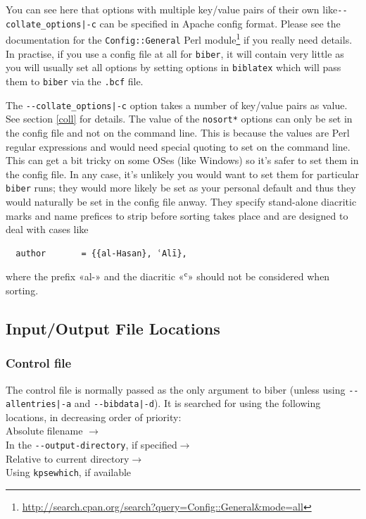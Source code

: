 \documentclass{ltxdockit}
\begin{document}
\noindent You can see here that options with multiple key/value pairs of
their own like\linebreak[4] \verb+--collate_options|-c+ can be specified in
Apache config format. Please see the documentation
for the \verb+Config::General+ Perl
module\footnote{\url{http://search.cpan.org/search?query=Config::General&mode=all}}
if you really need details. In practise, if you use a config file at all
for \verb+biber+, it will contain very little as you will usually set all
options by setting options in \verb+biblatex+ which will pass them to
\verb+biber+ via the \verb+.bcf+ file.

The \verb+--collate_options|-c+ option takes a number of key/value pairs as
value. See section \ref{coll} for details. The value of the \verb+nosort*+
options can only be set in the config file and not on the command line.
This is because the values are Perl regular expressions and would need
special quoting to set on the command line. This can get a bit tricky on
some OSes (like Windows) so it's safer to set them in the config file. In
any case, it's unlikely you would want to set them for particular
\verb+biber+ runs; they would more likely be set as your personal default
and thus they would naturally be set in the config file anway. They specify
stand-alone diacritic marks and name prefices to strip before sorting takes
place and are designed to deal with cases like

\begin{verbatim}
  author	   = {{al-Hasan}, ʿAlī},
\end{verbatim}

\noindent where the prefix «al-» and the diacritic «ʿ» should not be
considered when sorting.

\subsection{Input/Output File Locations}

\subsubsection{Control file}\label{loc:cf}

The control file is normally passed as the only argument to biber
(unless using \verb+--allentries|-a+ and \verb+--bibdata|-d+). It is
searched for using the following locations, in decreasing order of
priority:\\[2ex]

\noindent Absolute filename $\rightarrow$\\
\hspace*{1em}In the \verb+--output-directory+, if specified$\rightarrow$\\
\hspace*{2em}Relative to current directory$\rightarrow$\\
\hspace*{3em}Using \verb+kpsewhich+, if available
\end{document}
